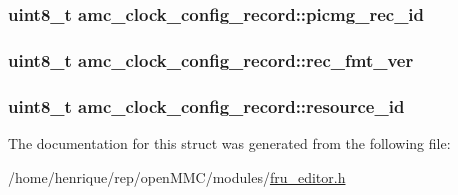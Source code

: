 \hypertarget{structamc__clock__config__record_ad026c13d38c2deacad8e1358b4676fd6}{
\subsubsection[{picmg\-\_\-rec\-\_\-id}]{\setlength{\rightskip}{0pt plus 5cm}uint8\-\_\-t amc\-\_\-clock\-\_\-config\-\_\-record\-::picmg\-\_\-rec\-\_\-id}}\label{structamc__clock__config__record_ad026c13d38c2deacad8e1358b4676fd6}
\hypertarget{structamc__clock__config__record_a353e66f2a504c783f3b5d540211dd239}{
\subsubsection[{rec\-\_\-fmt\-\_\-ver}]{\setlength{\rightskip}{0pt plus 5cm}uint8\-\_\-t amc\-\_\-clock\-\_\-config\-\_\-record\-::rec\-\_\-fmt\-\_\-ver}}\label{structamc__clock__config__record_a353e66f2a504c783f3b5d540211dd239}
\hypertarget{structamc__clock__config__record_abb049827c3562c1c7284f152d5960ec6}{
\subsubsection[{resource\-\_\-id}]{\setlength{\rightskip}{0pt plus 5cm}uint8\-\_\-t amc\-\_\-clock\-\_\-config\-\_\-record\-::resource\-\_\-id}}\label{structamc__clock__config__record_abb049827c3562c1c7284f152d5960ec6}


The documentation for this struct was generated from the following file\-:\begin{DoxyCompactItemize}
\item 
/home/henrique/rep/open\-M\-M\-C/modules/\hyperlink{fru__editor_8h}{fru\-\_\-editor.\-h}\end{DoxyCompactItemize}
